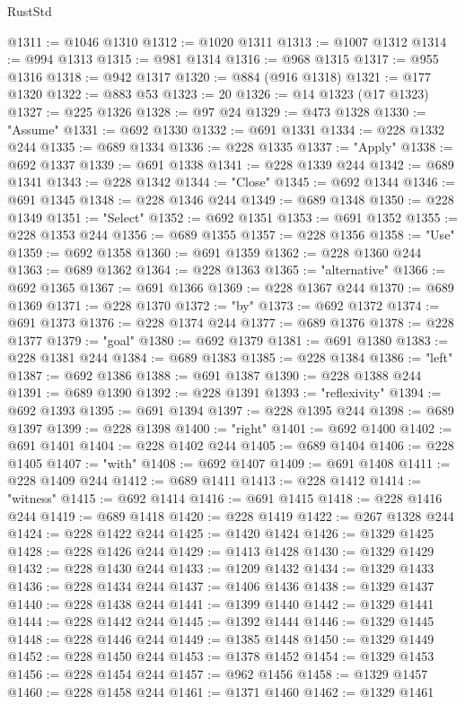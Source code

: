 \begin{lexlean}{RustStd}
\begin{coremodule}
@1311 := @1046 @1310
@1312 := @1020 @1311
@1313 := @1007 @1312
@1314 := @994 @1313
@1315 := @981 @1314
@1316 := @968 @1315
@1317 := @955 @1316
@1318 := @942 @1317
@1320 := @884 (@916 @1318)
@1321 := @177 @1320
@1322 := @883 @53
@1323 := 20
@1326 := @14 @1323 (@17 @1323)
@1327 := @225 @1326
@1328 := @97 @24
@1329 := @473 @1328
@1330 := "Assume"
@1331 := @692 @1330
@1332 := @691 @1331
@1334 := @228 @1332 @244
@1335 := @689 @1334
@1336 := @228 @1335
@1337 := "Apply"
@1338 := @692 @1337
@1339 := @691 @1338
@1341 := @228 @1339 @244
@1342 := @689 @1341
@1343 := @228 @1342
@1344 := "Close"
@1345 := @692 @1344
@1346 := @691 @1345
@1348 := @228 @1346 @244
@1349 := @689 @1348
@1350 := @228 @1349
@1351 := "Select"
@1352 := @692 @1351
@1353 := @691 @1352
@1355 := @228 @1353 @244
@1356 := @689 @1355
@1357 := @228 @1356
@1358 := "Use"
@1359 := @692 @1358
@1360 := @691 @1359
@1362 := @228 @1360 @244
@1363 := @689 @1362
@1364 := @228 @1363
@1365 := "alternative"
@1366 := @692 @1365
@1367 := @691 @1366
@1369 := @228 @1367 @244
@1370 := @689 @1369
@1371 := @228 @1370
@1372 := "by"
@1373 := @692 @1372
@1374 := @691 @1373
@1376 := @228 @1374 @244
@1377 := @689 @1376
@1378 := @228 @1377
@1379 := "goal"
@1380 := @692 @1379
@1381 := @691 @1380
@1383 := @228 @1381 @244
@1384 := @689 @1383
@1385 := @228 @1384
@1386 := "left"
@1387 := @692 @1386
@1388 := @691 @1387
@1390 := @228 @1388 @244
@1391 := @689 @1390
@1392 := @228 @1391
@1393 := "reflexivity"
@1394 := @692 @1393
@1395 := @691 @1394
@1397 := @228 @1395 @244
@1398 := @689 @1397
@1399 := @228 @1398
@1400 := "right"
@1401 := @692 @1400
@1402 := @691 @1401
@1404 := @228 @1402 @244
@1405 := @689 @1404
@1406 := @228 @1405
@1407 := "with"
@1408 := @692 @1407
@1409 := @691 @1408
@1411 := @228 @1409 @244
@1412 := @689 @1411
@1413 := @228 @1412
@1414 := "witness"
@1415 := @692 @1414
@1416 := @691 @1415
@1418 := @228 @1416 @244
@1419 := @689 @1418
@1420 := @228 @1419
@1422 := @267 @1328 @244
@1424 := @228 @1422 @244
@1425 := @1420 @1424
@1426 := @1329 @1425
@1428 := @228 @1426 @244
@1429 := @1413 @1428
@1430 := @1329 @1429
@1432 := @228 @1430 @244
@1433 := @1209 @1432
@1434 := @1329 @1433
@1436 := @228 @1434 @244
@1437 := @1406 @1436
@1438 := @1329 @1437
@1440 := @228 @1438 @244
@1441 := @1399 @1440
@1442 := @1329 @1441
@1444 := @228 @1442 @244
@1445 := @1392 @1444
@1446 := @1329 @1445
@1448 := @228 @1446 @244
@1449 := @1385 @1448
@1450 := @1329 @1449
@1452 := @228 @1450 @244
@1453 := @1378 @1452
@1454 := @1329 @1453
@1456 := @228 @1454 @244
@1457 := @962 @1456
@1458 := @1329 @1457
@1460 := @228 @1458 @244
@1461 := @1371 @1460
@1462 := @1329 @1461

\end{coremodule}
\end{lexlean}
